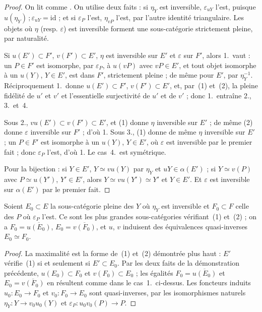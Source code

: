\begin{proof}
On lit  comme . On utilise deux faits : si $\eta_Y$ est inversible, $\varepsilon_{uY}$ l'est, puisque $u(\eta_Y)\,;\varepsilon_{uY} = \mathrm{id}$ ; et si $\varepsilon_P$ l'est, $\eta_{vP}$ l'est, par l'autre identité triangulaire. Les objets où $\eta$ (resp. $\varepsilon$) est inversible forment une sous-catégorie strictement pleine, par naturalité.

Si $u(E') \subset F'$, $v(F') \subset E'$, $\eta$ est inversible sur $E'$ et $\varepsilon$ sur $F'$, alors 1.\ vaut : un $P \in F'$ est isomorphe, par $\varepsilon_P$, à $u(vP)$ avec $vP \in E'$, et tout objet isomorphe à un $u(Y)$, $Y \in E'$, est dans $F'$, strictement pleine ; de même pour $E'$, par $\eta_Y^{-1}$. Réciproquement 1.\ donne $u(E') \subset F'$, $v(F') \subset E'$, et, par~(1) et~(2), la pleine fidélité de $u'$ et $v'$ et l'essentielle surjectivité de $u'$ et de $v'$ ; donc 1.\ entraîne 2., 3.\ et~4.

Sous 2., $vu(E') \subset v(F') \subset E'$, et (1) donne $\eta$ inversible sur $E'$ ; de même (2) donne $\varepsilon$ inversible sur $F'$ ; d'où 1. Sous 3., (1) donne de même $\eta$ inversible sur $E'$ ; un $P \in F'$ est isomorphe à un $u(Y)$, $Y \in E'$, où $\varepsilon$ est inversible par le premier fait ; donc $\varepsilon_P$ l'est, d'où 1. Le cas~4.\ est symétrique.

Pour la bijection : si $Y \in E'$, $Y \simeq vu(Y)$ par $\eta_Y$ et $uY \in \alpha(E')$ ; si $Y \simeq v(P)$ avec $P \simeq u(Y')$, $Y' \in E'$, alors $Y \simeq vu(Y') \simeq Y'$ et $Y \in E'$. Et $\varepsilon$ est inversible sur $\alpha(E')$ par le premier fait.
\end{proof}

\begin{enonce}
Soient $E_0 \subset E$ la sous-catégorie pleine des $Y$ où $\eta_Y$ est inversible et $F_0 \subset F$ celle des $P$ où $\varepsilon_P$ l'est. Ce sont les plus grandes sous-catégories vérifiant~(1) et~(2) ; on a $F_0 = \overline{u(E_0)}$, $E_0 = \overline{v(F_0)}$, et $u$, $v$ induisent des équivalences quasi-inverses $E_0 \simeq F_0$.
\end{enonce}

\begin{proof}
La maximalité est la forme de~(1) et~(2) démontrée plus haut : $E'$ vérifie~(1) si et seulement si $E' \subset E_0$. Par les deux faits de la démonstration précédente, $u(E_0) \subset F_0$ et $v(F_0) \subset E_0$ ; les égalités $F_0 = \overline{u(E_0)}$ et $E_0 = \overline{v(F_0)}$ en résultent comme dans le cas~1.\ ci-dessus. Les foncteurs induits $u_0 : E_0 \to F_0$ et $v_0 : F_0 \to E_0$ sont quasi-inverses, par les isomorphismes naturels $\eta_Y : Y \to v_0u_0(Y)$ et $\varepsilon_P : u_0v_0(P) \to P$.
\end{proof}

